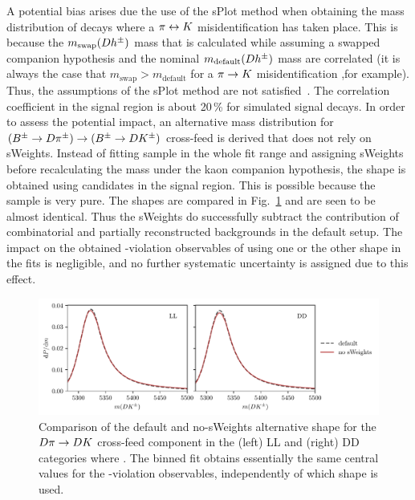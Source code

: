
A potential bias arises due the use of the sPlot method when obtaining the mass distribution of decays where a $\pi\leftrightarrow {\ensuremath{K}}$ misidentification has taken place. This is because the $m_\mathrm{swap}({D} h^\pm)$ mass that is calculated while assuming a swapped companion hypothesis and the nominal $m_\mathrm{default}({D} h^\pm)$ mass are correlated (it is always the case that $m_\mathrm{swap} > m_\mathrm{default}$ for a $\pi\rightarrow{\ensuremath{K}}$ misidentification ,for example). Thus, the assumptions of the sPlot method are not satisfied~\cite{sPlot}. The correlation coefficient in the signal region is about 20\,\% for simulated signal decays. In order to assess the potential impact, an alternative mass distribution for $({{{B}^\pm}\rightarrow{\ensuremath{D}}{\ensuremath{{\pi}^\pm}}})\rightarrow({{{B}^\pm}\rightarrow{\ensuremath{D}}{\ensuremath{{K}^\pm}}})$ cross-feed is derived that does not rely on sWeights. Instead of fitting \BtoDpi sample in the whole fit range and assigning sWeights before recalculating the \B mass under the kaon companion hypothesis, the shape is obtained using \BtoDpi candidates in the signal region. This is possible because the \BtoDpi sample is very pure. The shapes are compared in Fig.~\ref{fig:compare_alt_noSW_misID_shapes} and are seen to be almost identical. Thus the sWeights do successfully subtract the contribution of combinatorial and partially reconstructed backgrounds in the default setup. The impact on the obtained \CP-violation observables of using one or the other shape in the fits is negligible, and no further systematic uncertainty is assigned due to this effect. 

\begin{figure}[tp]
    \centering
    \includegraphics[width=0.85\columnwidth]{figures/analysis/systematics/misID_sW.pdf}
    \caption{Comparison of the default and no-sWeights alternative shape for the ${D}\pi\rightarrow{\ensuremath{D}}{\ensuremath{K}}$ cross-feed component in the (left) LL and (right) DD categories where \DtoKspipi. The binned fit obtains essentially the same central values for the \CP-violation observables, independently of which shape is used. }
    \label{fig:compare_alt_noSW_misID_shapes}
\end{figure}



